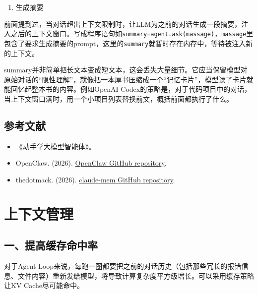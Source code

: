 \begin{enumerate}
\def\labelenumi{\arabic{enumi}.}
\setcounter{enumi}{1}
\tightlist
\item
  生成摘要
\end{enumerate}

前面提到过，当对话超出上下文限制时，让LLM为之前的对话生成一段摘要，注入之后的上下文窗口。写成程序语句如\texttt{summary=agent.ask(massage)}，\texttt{massage}里包含了要求生成摘要的prompt，这里的\texttt{summary}就暂时存在内存中，等待被注入新的上下文。

summary并非简单把长文本变成短文本，这会丢失大量细节。它应当保留模型对原始对话的``隐性理解''，就像把一本厚书压缩成一个``记忆卡片''，模型读了卡片就能回忆起整本书的内容。例如OpenAI Codex的策略是，对于代码项目中的对话，当上下文窗口满时，用一个小项目列表替换前文，概括前面都执行了什么。

\hypertarget{ux53c2ux8003ux6587ux732e-133}{%
\subsection{参考文献}\label{ux53c2ux8003ux6587ux732e-133}}

\begin{itemize}
\tightlist
\item
  《动手学大模型智能体》。
\item
  OpenClaw. (2026). \href{https://github.com/openclaw/openclaw}{OpenClaw GitHub repository}.
\item
  thedotmack. (2026). \href{https://github.com/thedotmack/claude-mem}{claude-mem GitHub repository}.
\end{itemize}

\clearpage

\hypertarget{ux4e0aux4e0bux6587ux7ba1ux7406}{%
\section{上下文管理}\label{ux4e0aux4e0bux6587ux7ba1ux7406}}

\hypertarget{ux4e00ux63d0ux9ad8ux7f13ux5b58ux547dux4e2dux7387}{%
\subsection{一、提高缓存命中率}\label{ux4e00ux63d0ux9ad8ux7f13ux5b58ux547dux4e2dux7387}}

对于Agent Loop来说，每跑一圈都要把之前的对话历史（包括那些冗长的报错信息、文件内容）重新发给模型，将导致计算复杂度平方级增长。可以采用缓存策略让KV Cache尽可能命中。

